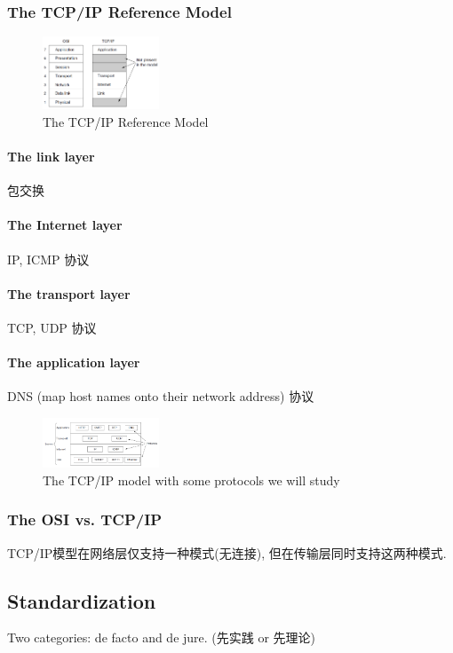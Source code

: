 \subsubsection{The TCP/IP Reference Model}
\begin{figure}[!htb]
    \centering
    \includegraphics[width=0.309\textwidth]{pic/CN1/The TCPIP Reference Model}
    \caption{The TCP/IP Reference Model}
\end{figure}

\paragraph{The link layer} 包交换
\paragraph{The Internet layer} IP, ICMP 协议
\paragraph{The transport layer} TCP, UDP 协议
\paragraph{The application layer} DNS (map host names onto their network address) 协议

\begin{figure}[!htb]
    \centering
    \includegraphics[width=0.309\textwidth]{pic/CN1/study.png}
    \caption{\small The TCP/IP model with some protocols we will study}
\end{figure}

\subsubsection{The OSI vs. TCP/IP}
TCP/IP模型在网络层仅支持一种模式(无连接), 但在传输层同时支持这两种模式. 

\subsection{Standardization}
Two categories: de facto and de jure. (先实践 or 先理论)

